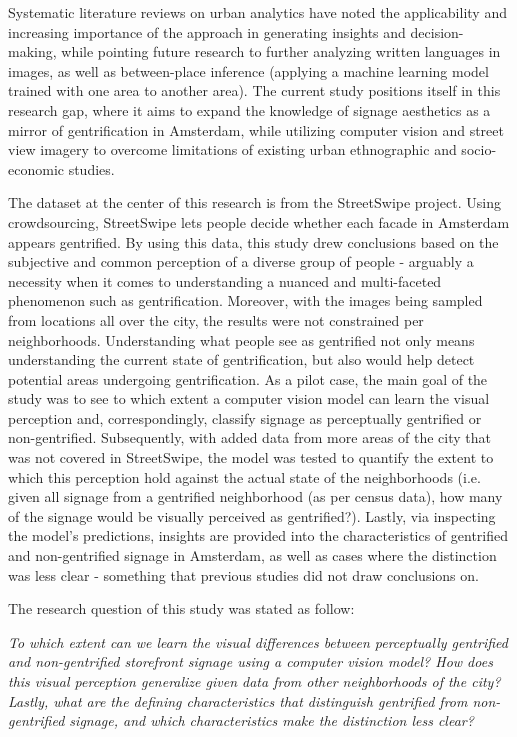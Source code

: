 Systematic literature reviews on urban analytics \cite{biljecki_street_2021, zhanga_urban_2023} have noted the applicability and increasing importance of the approach in generating insights and decision-making, while pointing future research to further analyzing written languages in images, as well as between-place inference (applying a machine learning model trained with one area to another area). The current study positions itself in this research gap, where it aims to expand the knowledge of signage aesthetics as a mirror of gentrification in Amsterdam, while utilizing computer vision and street view imagery to overcome limitations of existing urban ethnographic and socio-economic studies.

The dataset at the center of this research is from the StreetSwipe project. Using crowdsourcing, StreetSwipe \cite{streetswipe} lets people decide whether each facade in Amsterdam appears gentrified. By using this data, this study drew conclusions based on the subjective and common perception of a diverse group of people - arguably a necessity when it comes to understanding a nuanced and multi-faceted phenomenon such as gentrification. Moreover, with the images being sampled from locations all over the city, the results were not constrained per neighborhoods. Understanding what people see as gentrified not only means understanding the current state of gentrification, but also would help detect potential areas undergoing gentrification. As a pilot case, the main goal of the study was to see to which extent a computer vision model can learn the visual perception and, correspondingly, classify signage as perceptually gentrified or non-gentrified. Subsequently, with added data from more areas of the city that was not covered in StreetSwipe, the model was tested to quantify the extent to which this perception hold against the actual state of the neighborhoods (i.e. given all signage from a gentrified neighborhood (as per census data), how many of the signage would be visually perceived as gentrified?). Lastly, via inspecting the model's predictions, insights are provided into the characteristics of gentrified and non-gentrified signage in Amsterdam, as well as cases where the distinction was less clear - something that previous studies did not draw conclusions on.

The research question of this study was stated as follow: 

\noindent\textit{To which extent can we learn the visual differences between perceptually gentrified and non-gentrified storefront signage using a computer vision model? How does this visual perception generalize given data from other neighborhoods of the city? Lastly, what are the defining characteristics that distinguish gentrified from non-gentrified signage, and which characteristics make the distinction less clear?}

